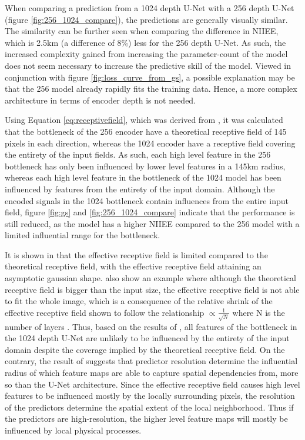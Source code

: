 \documentclass[../main/thesis]{subfiles}
\begin{document}
When comparing a prediction from a 1024 depth U-Net with a 256 depth U-Net (figure \ref{fig:256_1024_compare}), the predictions are generally visually similar. The similarity can be further seen when comparing the difference in NIIEE, which is 2.5km (a difference of 8\%) less for the 256 depth U-Net. As such, the increased complexity gained from increasing the parameter-count of the model does not seem necessary to increase the predictive skill of the model. Viewed in conjunction with figure \ref{fig:loss_curve_from_gs}, a possible explanation may be that the 256 model already rapidly fits the training data. Hence, a more complex architecture in terms of encoder depth is not needed.

Using Equation \ref{eq:receptivefield}, which was derived from \citet{Araujo2019}, it was calculated that the bottleneck of the 256 encoder have a theoretical receptive field of 145 pixels in each direction, whereas the 1024 encoder have a receptive field covering the entirety of the input fields. As such, each high level feature in the 256 bottleneck has only been influenced by lower level features in a 145km radius, whereas each high level feature in the bottleneck of the 1024 model has been influenced by features from the entirety of the input domain. Although the encoded signals in the 1024 bottleneck contain influences from the entire input field, figure \ref{fig:gs} and \ref{fig:256_1024_compare} indicate that the performance is still reduced, as the model has a higher NIIEE compared to the 256 model with a limited influential range for the bottleneck. 

It is shown in \citet{Luo2017} that the effective receptive field is limited compared to the theoretical receptive field, with the effective receptive field attaining an asymptotic gaussian shape. \citet{Luo2017} also show an example where although the theoretical receptive field is bigger than the input size, the effective receptive field is not able to fit the whole image, which is a consequence of the relative shrink of the effective receptive field shown to follow the relationship $\propto \frac{1}{\sqrt{N}}$ where N is the number of layers \citep{Luo2017}. Thus, based on the results of \citet{Luo2017}, all features of the bottleneck in the 1024 depth U-Net are unlikely to be influenced by the entirety of the input domain despite the coverage implied by the theoretical receptive field. On the contrary, the result of \citet{Luo2017} suggests that predictor resolution determine the influential radius of which feature maps are able to capture spatial dependencies from, more so than the U-Net architecture. Since the effective receptive field causes high level features to be influenced mostly by the locally surrounding pixels, the resolution of the predictors determine the spatial extent of the local neighborhood. Thus if the predictors are high-resolution, the higher level feature maps will mostly be influenced by local physical processes.
\end{document}

